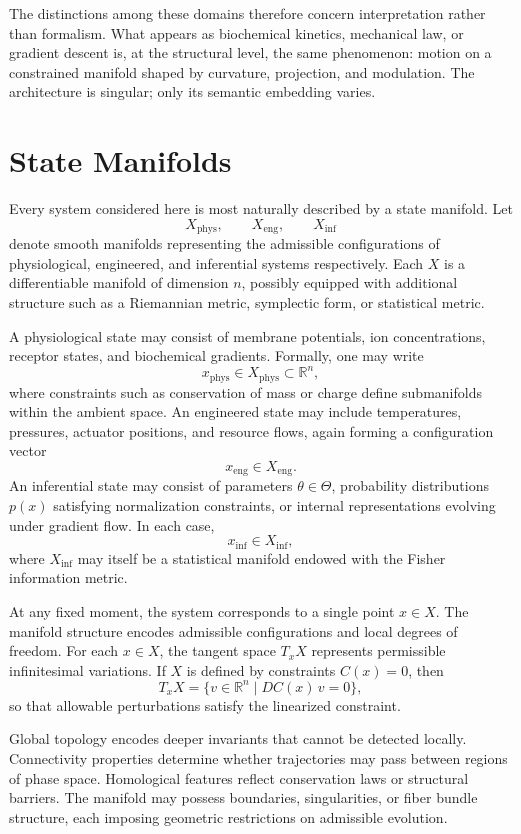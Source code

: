 \documentclass[12pt]{book}
\begin{document}
The distinctions among these domains therefore concern interpretation rather than formalism. What appears as biochemical kinetics, mechanical law, or gradient descent is, at the structural level, the same phenomenon: motion on a constrained manifold shaped by curvature, projection, and modulation. The architecture is singular; only its semantic embedding varies.

\section{State Manifolds}

Every system considered here is most naturally described by a state manifold. Let
\[
X_{\text{phys}}, \qquad 
X_{\text{eng}}, \qquad 
X_{\text{inf}}
\]
denote smooth manifolds representing the admissible configurations of physiological, engineered, and inferential systems respectively. Each $X$ is a differentiable manifold of dimension $n$, possibly equipped with additional structure such as a Riemannian metric, symplectic form, or statistical metric.

A physiological state may consist of membrane potentials, ion concentrations, receptor states, and biochemical gradients. Formally, one may write
\[
x_{\text{phys}} \in X_{\text{phys}} \subset \mathbb{R}^n,
\]
where constraints such as conservation of mass or charge define submanifolds within the ambient space. An engineered state may include temperatures, pressures, actuator positions, and resource flows, again forming a configuration vector
\[
x_{\text{eng}} \in X_{\text{eng}}.
\]
An inferential state may consist of parameters $\theta \in \Theta$, probability distributions $p(x)$ satisfying normalization constraints, or internal representations evolving under gradient flow. In each case,
\[
x_{\text{inf}} \in X_{\text{inf}},
\]
where $X_{\text{inf}}$ may itself be a statistical manifold endowed with the Fisher information metric.

At any fixed moment, the system corresponds to a single point $x \in X$. The manifold structure encodes admissible configurations and local degrees of freedom. For each $x \in X$, the tangent space $T_x X$ represents permissible infinitesimal variations. If $X$ is defined by constraints $C(x)=0$, then
\[
T_x X = \{ v \in \mathbb{R}^n \mid DC(x)\, v = 0 \},
\]
so that allowable perturbations satisfy the linearized constraint.

Global topology encodes deeper invariants that cannot be detected locally. Connectivity properties determine whether trajectories may pass between regions of phase space. Homological features reflect conservation laws or structural barriers. The manifold may possess boundaries, singularities, or fiber bundle structure, each imposing geometric restrictions on admissible evolution.
\end{document}
